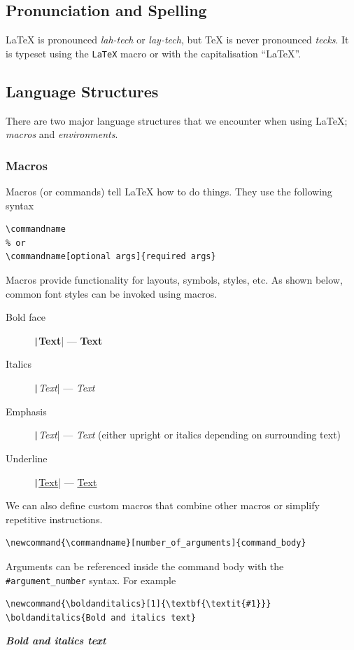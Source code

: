 \documentclass[11pt, twoside]{article}
\begin{document}
\subsection{Pronunciation and Spelling}
\LaTeX{} is pronounced \emph{lah-tech} or \emph{lay-tech}, but \TeX{} is
never pronounced \emph{tecks}. It is typeset using the
\texttt{\LaTeX{}} macro or with the capitalisation ``LaTeX''.
\subsection{Language Structures}
There are two major language structures that we encounter when using
\LaTeX{}; \textit{macros} and \textit{environments}.
\subsubsection{Macros}
Macros (or commands) tell \LaTeX{} how to do things. They use the
following syntax
\begin{verbatim}
\commandname
% or
\commandname[optional args]{required args}
\end{verbatim}
Macros provide functionality for layouts, symbols, styles, etc. As
shown below, common font styles can be invoked using macros.
\begin{description}
    \item[Bold face] \texttt|\textbf{Text}| --- \textbf{Text}
    \item[Italics] \texttt|\textit{Text}| --- \textit{Text}
    \item[Emphasis] \texttt|\emph{Text}| --- \emph{Text}
          (either upright or italics depending on surrounding text)
    \item[Underline] \texttt|\underline{Text}| ---
          \underline{Text}
\end{description}
We can also define custom macros that combine other macros or simplify repetitive instructions.
\begin{verbatim}
\newcommand{\commandname}[number_of_arguments]{command_body}
\end{verbatim}
Arguments can be referenced inside the command body with the
\texttt{#argument_number} syntax. For example
\begin{verbatim}
\newcommand{\boldanditalics}[1]{\textbf{\textit{#1}}}
\boldanditalics{Bold and italics text}
\end{verbatim}
\newcommand{\boldanditalics}[1]{\textbf{\textit{#1}}}
\begin{outputbox}
    \boldanditalics{Bold and italics text}
\end{outputbox}
\end{document}
